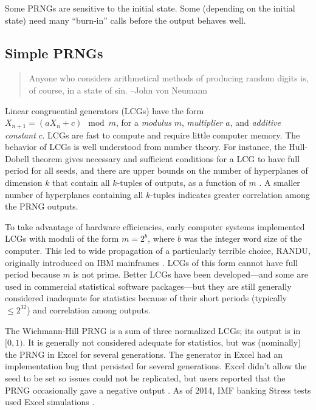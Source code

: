 \documentclass[graybox]{svmult}
\begin{document}
Some PRNGs are sensitive to the initial state.
Some (depending on the initial state) need many ``burn-in'' calls before the output 
behaves well.

\subsection{Simple PRNGs}

\begin{quotation}
Anyone who considers arithmetical methods of producing random digits is, of course, in a state of sin.  --John von Neumann
\end{quotation}


Linear congruential generators (LCGs) have the form $X_{n+1} = (a X_n + c) \mod m$, for a 
\emph{modulus} $m$, 
\emph{multiplier} $a$, and \emph{additive constant} $c$.
LCGs are fast to compute and require little computer memory.
The behavior of LCGs is well understood from number theory.
For instance, the Hull-Dobell theorem \cite{hullDobell62}
gives necessary and sufficient conditions for a LCG to have full period for all seeds,
and there are upper bounds on the number of hyperplanes of dimension $k$
that contain all $k$-tuples of outputs, as a function of $m$ \cite{marsaglia_random_1968}.
A smaller number of hyperplanes containing all $k$-tuples indicates greater correlation among the PRNG outputs.

To take advantage of hardware efficiencies, early computer systems implemented LCGs 
with moduli of the form 
$m = 2^b$, where
$b$ was the integer word size of the computer.
This led to wide propagation of a particularly terrible choice, RANDU, originally introduced
on IBM mainframes \cite{knuth_art_1997,markowsky14}.
LCGs of this form cannot have full period because $m$ is not prime. 
Better LCGs have been developed---and some are used in commercial statistical software packages---but they are still
generally considered inadequate for statistics because of their short periods (typically $ \le 2^{32}$) 
and correlation among outputs.

The Wichmann-Hill PRNG is a sum of three normalized LCGs; its output is in $[0, 1)$.
%
It is generally not considered adequate for statistics, but was (nominally) the PRNG in Excel for several generations. 
The generator in Excel had an implementation bug that persisted for several generations.
Excel didn't allow the seed to be set so issues could not be replicated, but users reported that the PRNG occasionally gave a negative output \cite{mccullough_microsoft_2008}.
As of 2014, IMF banking Stress tests used Excel simulations \cite{ong14}.
\end{document}
